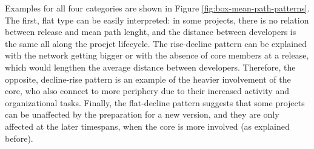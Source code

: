 Examples for all four categories are shown in Figure \ref{fig:box-mean-path-patterns}. The first, flat type can be easily interpreted: in some projects, there is no relation between release and mean path lenght, and the distance between developers is the same all along the proejct lifecycle. The rise-decline pattern can be explained with the network getting bigger or with the absence of core members at a release, which would lengthen the average distance between developers. Therefore, the opposite, decline-rise pattern is an example of the heavier involvement of the core, who also connect to more periphery due to their increased activity and organizational tasks. Finally, the flat-decline pattern suggests that some projects can be unaffected by the preparation for a new version, and they are only affected at the later timespans, when the core is more involved (as explained before).

